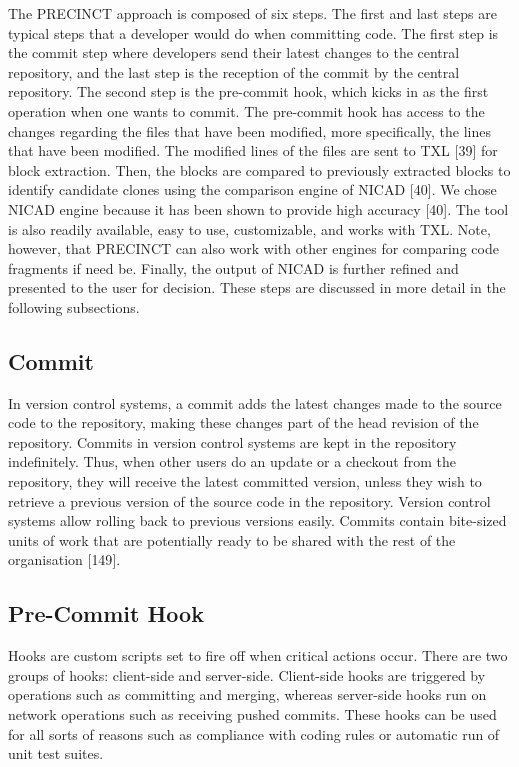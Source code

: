 \documentclass[12pt]{report}
\begin{document}
The PRECINCT approach is composed of six steps. The first and last steps
are typical steps that a developer would do when committing code. The
first step is the commit step where developers send their latest changes
to the central repository, and the last step is the reception of the
commit by the central repository. The second step is the pre-commit
hook, which kicks in as the first operation when one wants to commit.
The pre-commit hook has access to the changes regarding the files that
have been modified, more specifically, the lines that have been
modified. The modified lines of the files are sent to TXL {[}39{]} for
block extraction. Then, the blocks are compared to previously extracted
blocks to identify candidate clones using the comparison engine of NICAD
{[}40{]}. We chose NICAD engine because it has been shown to provide
high accuracy {[}40{]}. The tool is also readily available, easy to use,
customizable, and works with TXL. Note, however, that PRECINCT can also
work with other engines for comparing code fragments if need be.
Finally, the output of NICAD is further refined and presented to the
user for decision. These steps are discussed in more detail in the
following subsections.

\subsection{Commit}\label{commit}

In version control systems, a commit adds the latest changes made to the
source code to the repository, making these changes part of the head
revision of the repository. Commits in version control systems are kept
in the repository indefinitely. Thus, when other users do an update or a
checkout from the repository, they will receive the latest committed
version, unless they wish to retrieve a previous version of the source
code in the repository. Version control systems allow rolling back to
previous versions easily. Commits contain bite-sized units of work that
are potentially ready to be shared with the rest of the organisation
{[}149{]}.

\subsection{Pre-Commit Hook}\label{pre-commit-hook}

Hooks are custom scripts set to fire off when critical actions occur.
There are two groups of hooks: client-side and server-side. Client-side
hooks are triggered by operations such as committing and merging,
whereas server-side hooks run on network operations such as receiving
pushed commits. These hooks can be used for all sorts of reasons such as
compliance with coding rules or automatic run of unit test suites.
\end{document}
